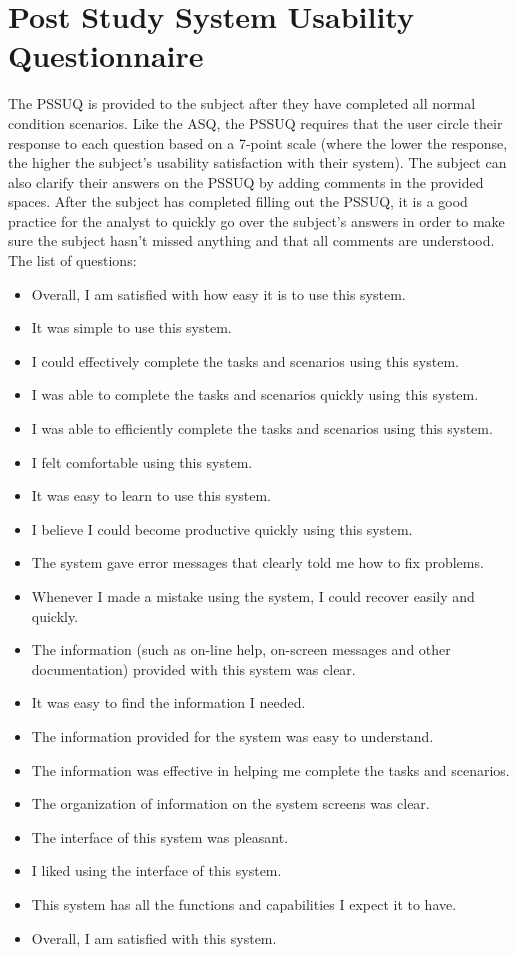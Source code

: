 \section{Post Study System Usability Questionnaire}
The PSSUQ is provided to the subject after they have completed all normal condition scenarios. Like the ASQ, the PSSUQ requires that the user circle their response to each question based on a 7-point scale (where the lower the response, the higher the subject’s usability satisfaction with their system). The subject can also clarify their answers on the PSSUQ by adding comments in the provided spaces.
After the subject has completed filling out the PSSUQ, it is a good practice for the analyst to quickly go over the subject’s answers in order to make sure the subject hasn’t missed anything and that all comments are understood.
The list of questions:
\begin{itemize}
	\item Overall, I am satisfied with how easy it is to use this system.
	\item It was simple to use this system.
	\item I could effectively complete the tasks and scenarios using this system.
	\item I was able to complete the tasks and scenarios quickly using this system.
	\item I was able to efficiently complete the tasks and scenarios using this system.
	\item I felt comfortable using this system.
	\item It was easy to learn to use this system.
	\item I believe I could become productive quickly using this system.
	\item The system gave error messages that clearly told me how to fix problems.
	\item Whenever I made a mistake using the system, I could recover easily and quickly.
	\item The information (such as on-line help, on-screen messages and other documentation) provided with this system was clear.
	\item It was easy to find the information I needed.
	\item The information provided for the system was easy to understand.
	\item The information was effective in helping me complete the tasks and scenarios.
	\item The organization of information on the system screens was clear.
	\item The interface of this system was pleasant.
	\item I liked using the interface of this system.
	\item This system has all the functions and capabilities I expect it to have.
	\item Overall, I am satisfied with this system.
\end{itemize}
